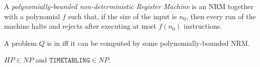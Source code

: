 \documentclass{article}
\begin{document}
\begin{definition}
	A \emph{polynomially-bounded non-deterministic Register Machine} is an NRM together with a polynomial
	$f$ such that, if the size of the input is $n_0$, then every run of the machine halts and
	rejects after executing at most $f(n_0)$ instructions.

	A problem $Q$ is in \nptime iff it can be computed by some polynomially-bounded NRM.
\end{definition}

\begin{theorem}[Notes II.12]
	$HP\in NP$ and $\texttt{TIMETABLING}\in NP$.
\end{theorem}
\end{document}
